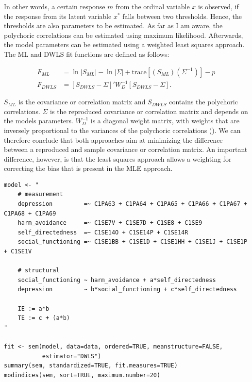 \documentclass[11pt]{article}
\begin{document}
In other words, a certain response $m$ from the ordinal variable $x$ is
observed, if the response from its latent variable $x^*$ falls between two
thresholds. Hence, the thresholds are also parameters to be estimated. As far as
I am aware, the polychoric correlations can be estimated using maximum
likelihood. Afterwards, the model parameters can be estimated using a weighted
least squares approach. The ML and DWLS fit functions are defined as follows:

\begin{align}
  F_{ML} &= \ln |S_{ML}| - \ln |\Sigma| + \text{trace}[(S_{ML})(\Sigma^{-1})] - p \tag{ML fit function} \\
  F_{DWLS} &= [S_{DWLS}-\Sigma]' W^{-1}_D [S_{DWLS}-\Sigma].                      \tag{DWLS fit function}
\end{align}

$S_{ML}$ is the covariance or correlation matrix and $S_{DWLS}$ contains the
polychoric correlations. $\Sigma$ is the reproduced covariance or correlation
matrix and depends on the models parameters. $W_D^{-1}$ is a diagonal weight
matrix, with weights that are inversely proportional to the variances of the
polychoric correlations (\cite{yangwallentin2010}). We can therefore conclude
that both approaches aim at minimizing the difference between a reproduced and
sample covariance or correlation matrix. An important difference, however, is
that the least squares approach allows a weighting for correcting the bias that
is present in the MLE approach.

\begin{minipage}{\linewidth}
\begin{lstlisting}
model <- "
    # measurement
    depression         =~ C1PA63 + C1PA64 + C1PA65 + C1PA66 + C1PA67 + C1PA68 + C1PA69
    harm_avoidance     =~ C1SE7V + C1SE7D + C1SE8 + C1SE9
    self_directedness  =~ C1SE14O + C1SE14P + C1SE14R
    social_functioning =~ C1SE1BB + C1SE1D + C1SE1HH + C1SE1J + C1SE1P + C1SE1V

    # structural
    social_functioning ~ harm_avoidance + a*self_directedness
    depression         ~ b*social_functioning + c*self_directedness
    
    IE := a*b
    TE := c + (a*b) 
"

fit <- sem(model, data=data, ordered=TRUE, meanstructure=FALSE,
           estimator="DWLS")
summary(sem, standardized=TRUE, fit.measures=TRUE)
modindices(sem, sort=TRUE, maximum.number=20)
\end{lstlisting}
\end{minipage}
\end{document}
